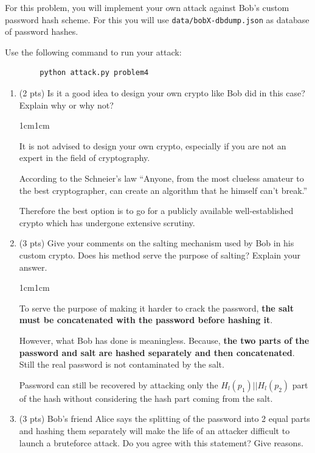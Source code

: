 \documentclass[11pt,letterpaper]{article}
\newenvironment{answer}{\em \color{blue} \begin{adjustwidth}{1cm}{1cm}}{\end{adjustwidth}}
\begin{document}
	
	For this problem, you will implement your own attack against Bob's custom password hash scheme. For this you will use \texttt{data/bobX-dbdump.json} as database of password hashes.
	
	Use the following command to run your attack:
	\begin{Verbatim}
		python attack.py problem4
	\end{Verbatim}
	
	
	\begin{enumerate}
		
		\item (2 pts) Is it a good idea to design your own crypto like Bob did in this case? Explain why or why not?
		
		\begin{answer}
			
			It is not advised to design your own crypto, especially if you are not an expert in the field of cryptography. 
			
			According to the Schneier's law ``Anyone, from the most clueless amateur to the best cryptographer, can create an 
			algorithm that he himself can't break.'' 
			
			Therefore the best option is to go for a publicly available well-established crypto which has undergone extensive scrutiny.
			
		\end{answer}
		
		\item (3 pts) Give your comments on the salting mechanism used by Bob in his custom crypto. Does his method serve the purpose of salting? Explain your answer.
		
		\begin{answer}
			
			To serve the purpose of making it harder to crack the password, \textbf{the salt must be concatenated with the password before hashing it}. 
			
			However, what Bob has done is meaningless. Because, \textbf{the two parts of the password and salt are hashed separately and then concatenated}. Still the real password is not contaminated by the salt. 
			
			Password can still be recovered by attacking only the 	$H_l(p_1) || H_l(p_2)$ part of the hash without considering the hash part coming from the salt.
			
		\end{answer}
		
		\item (3 pts)  Bob’s friend Alice says the splitting of the password into 2 equal parts and hashing them separately will make the life of an attacker difficult to launch a bruteforce attack. Do you agree with this statement? Give reasons.
		

\end{enumerate}
\end{document}
